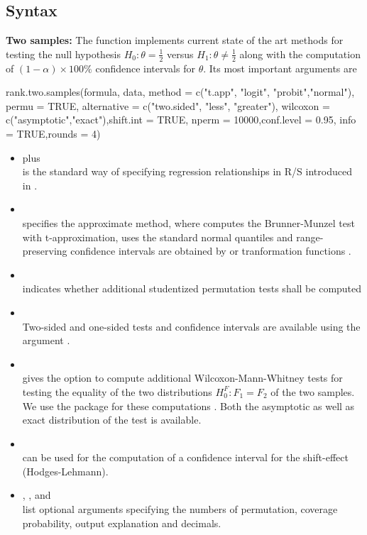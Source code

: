 \subsection{Syntax}
\textbf{Two samples:} The  function 
implements current state of the art methods for testing the null hypothesis 
$H_0: \theta=\frac12$ versus $H_1: \theta\not = \frac12$ along with the 
computation of $(1-\alpha)\times 100\%$ confidence intervals for $\theta$.
Its most important arguments are
\begin{example}
rank.two.samples(formula, data, method = c("t.app", "logit", "probit","normal"), 
permu = TRUE, alternative = c("two.sided", "less", "greater"),
wilcoxon = c("asymptotic","exact"),shift.int = TRUE, 
nperm = 10000,conf.level = 0.95, info = TRUE,rounds = 4) 
\end{example}



\begin{itemize}
\item  {} plus  \\
is the standard way of specifying regression relationships in 
R/S introduced in \cite{Chambers+Hastie:1992}.
\item {} \\
specifies the approximate method, where  computes the 
Brunner-Munzel test \citep{brunner2000nonparametric} with t-approximation, 
uses the standard normal quantiles and  
range-preserving confidence intervals are obtained by  or  
tranformation functions \citep{pauly2016permutation}.
\item {} \\ 
indicates whether additional studentized permutation tests shall be computed 
\citep{janssen1999testing, neubert2007studentized, pauly2016permutation}
\item {} \\
Two-sided and one-sided tests and confidence intervals are available using 
the argument . 
\item {} \\
gives the option to compute additional Wilcoxon-Mann-Whitney tests for testing 
the equality of the two distributions $H_0^F: F_1=F_2$ of the two samples. We 
use the  package for these computations 
\citep{zeileis2008implementing}. Both the asymptotic as well as exact 
distribution of the test is available.
\item {} \\
can be used for the computation of a confidence interval  for the shift-effect 
(Hodges-Lehmann).
\item {}, ,  and  \\ 
list optional arguments specifying the numbers of permutation, coverage 
probability, output explanation and decimals. 
\end{itemize}

